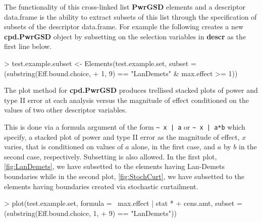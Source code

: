 \documentclass{article}
\begin{document}
\begin{Schunk}
\end{Schunk}

The functionality of this cross-linked list {\bf PwrGSD} elements and a
descriptor data.frame is the ability to extract subsets of this list through
the specification of subsets of the descriptor data.frame.  For example
the following creates a new {\bf cpd.PwrGSD} object by subsetting on
the selection variables in {\bf descr} as the first line below.

\begin{Schunk}
\begin{Sinput}
> test.example.subset <- Elements(test.example.set, subset = (substring(Eff.bound.choice, 
+     1, 9) == "LanDemets" & max.effect >= 1))
\end{Sinput}
\end{Schunk}

The plot method for {\bf cpd.PwrGSD} produces trellised stacked plots of
power and type II error at each analysis versus the magnitude of effect
conditioned on the values of two other descriptor variables. 

This is done via a formula argument of the form \verb`~ x | a` or 
\verb`~ x | a*b` which specify, a stacked plot of power and type II error as the magnitude
of effect, $x$ varies, that is conditioned on values of $a$ alone, in the
first case, and $a$ by $b$ in the second case, respectively. Subsetting is
also allowed.  In the first plot, \ref{fig:LanDemets}, we have subsetted to
the elements having Lan-Demets boundaries while in the second plot,
\ref{fig:StochCurt}, we have subsetted to the elements having boundaries
created via stochastic curtailment.

\begin{Schunk}
\begin{Sinput}
> plot(test.example.set, formula = ~max.effect | stat * 
+     cens.amt, subset = (substring(Eff.bound.choice, 1, 
+     9) == "LanDemets"))
\end{Sinput}
\end{Schunk}
\end{document}
